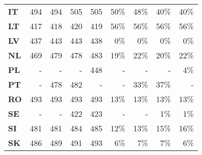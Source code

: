 \begin{tabular}{lrrrr|rrrr}
\textbf{IT     } &                        494 &  494 &  505 &  505 &             50\% &  48\% &  40\% &  40\% \\
\textbf{LT     } &                        417 &  418 &  420 &  419 &             56\% &  56\% &  56\% &  56\% \\
\textbf{LV     } &                        437 &  443 &  443 &  438 &              0\% &   0\% &   0\% &   0\% \\
\textbf{NL     } &                        469 &  479 &  478 &  483 &             19\% &  22\% &  20\% &  22\% \\
\textbf{PL     } &                          - &    - &    - &  448 &                - &     - &     - &   4\% \\
\textbf{PT     } &                          - &  478 &  482 &    - &                - &  33\% &  37\% &     - \\
\textbf{RO     } &                        493 &  493 &  493 &  493 &             13\% &  13\% &  13\% &  13\% \\
\textbf{SE     } &                          - &    - &  422 &  423 &                - &     - &   1\% &   1\% \\
\textbf{SI     } &                        481 &  481 &  484 &  485 &             12\% &  13\% &  15\% &  16\% \\
\textbf{SK     } &                        486 &  489 &  491 &  493 &              6\% &   7\% &   7\% &   6\% \\
\bottomrule
\end{tabular}
